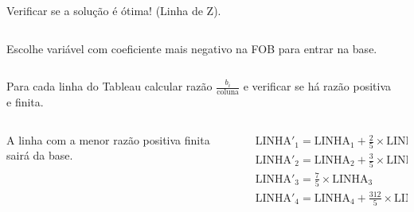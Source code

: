 \begin{frame}
	{
		\begin{columns}
			\begin{column}{5cm}
				\begin{mdframed}[backgroundcolor=olive!80]
					Verificar se a solução é ótima! (Linha de Z).
				\end{mdframed}
			\end{column}
			\begin{column}{5cm}

			\end{column}
		\end{columns}
	}	
	\only<11>
	{
		\begin{columns}
			\begin{column}{5cm}
				\begin{mdframed}[backgroundcolor=orange!80]
					Escolhe variável com coeficiente mais negativo na FOB para entrar na base.
				\end{mdframed}
			\end{column}
			\begin{column}{5cm}

			\end{column}
		\end{columns}
	}	
	\only<12>
	{
		\begin{columns}
			\begin{column}{5cm}
				\begin{mdframed}[backgroundcolor=olive!80]
					Para cada linha do Tableau calcular razão $\frac{b_i}{\text{coluna}}$ e verificar se há razão positiva e finita.
				\end{mdframed}
			\end{column}
			\begin{column}{5cm}

			\end{column}
		\end{columns}
	}	

	\only<13>
	{
		\begin{columns}
			\begin{column}{5cm}
				\begin{mdframed}[backgroundcolor=orange!80]
					A linha com a menor razão positiva finita sairá da base.
				\end{mdframed}
			\end{column}
			\begin{column}{5cm}
				$
					\begin{matrix}
						\scriptstyle \text{LINHA}'_1 = \text{LINHA}_1 + \frac{2}{5} \times \text{LINHA}_3\\
						\scriptstyle \text{LINHA}'_2 = \text{LINHA}_2 + \frac{3}{5} \times \text{LINHA}_3\\
						\scriptstyle \text{LINHA}'_3 = \frac{7}{5} \times \text{LINHA}_3  \\
						\scriptstyle \text{LINHA}'_4 = \text{LINHA}_4 + \frac{312}{5} \times \text{LINHA}_3 \\
					\end{matrix}
				$
			\end{column}
		\end{columns}
	}	



\end{frame}
